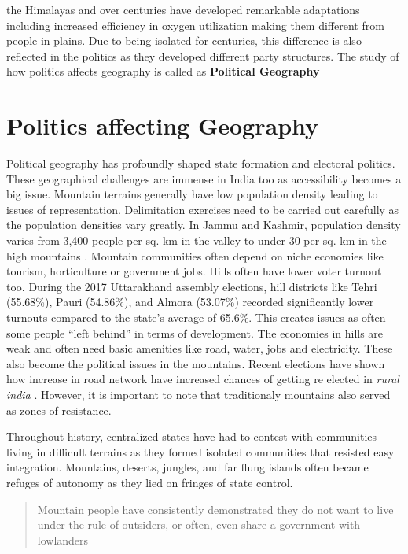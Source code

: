 the Himalayas and over centuries have developed remarkable adaptations including increased efficiency in oxygen utilization making them different from people in plains.  Due to being isolated for centuries, this difference is also reflected in the politics as they developed different party structures. The study of how politics affects geography is called as \textbf{Political Geography}

\section{Politics affecting Geography}

Political geography has profoundly shaped state formation and electoral politics. These geographical challenges are immense in India too as accessibility becomes a big issue. Mountain terrains generally have low population density leading to issues of representation. Delimitation exercises need to be carried out carefully as the population densities vary greatly. In Jammu and Kashmir, population density varies from  3,400 people per sq. km in the valley to under 30 per sq. km in the high mountains \citep{kumar2022measuring}. Mountain communities often depend on niche economies like tourism, horticulture or government jobs. Hills often have lower voter turnout too. During the 2017 Uttarakhand assembly elections, hill districts like Tehri (55.68\%), Pauri (54.86\%), and Almora (53.07\%) recorded significantly lower turnouts compared to the state's average of 65.6\%. This creates issues as often some people ``left behind'' in terms of development. The economies in hills are weak and often need basic amenities like road, water, jobs and electricity. These also become the political issues in the mountains. Recent elections have shown how increase in road network have increased chances of getting re elected in \textit{rural india} \citep{basistha2024elections}. However, it is important to note that traditionaly mountains also served as zones of resistance. 

 Throughout history, centralized states have had to contest with communities living in difficult terrains as they formed isolated communities that resisted easy integration. Mountains, deserts, jungles, and far flung islands often became refuges of autonomy  as they lied on fringes of state control. \begin{quote} Mountain people have consistently demonstrated they do not want to live under the rule of outsiders, or often, even share a government with lowlanders\end{quote} 

